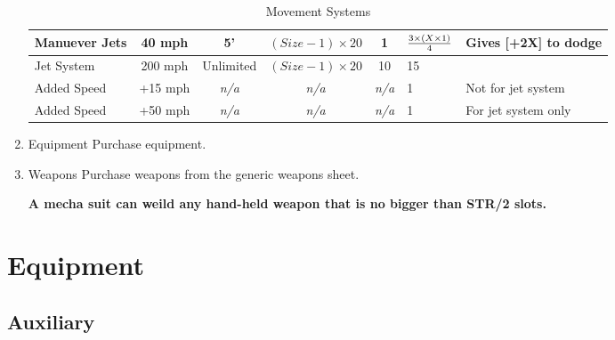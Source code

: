 \documentclass[twoside]{book}
\begin{document}
\begin{enumerate}
\begin{table}[!htb]
\begin{center}
\begin{tabular}{|l|c|c|c|c|p{2em}|p{5em}|}
\hline
Manuever Jets&40 mph&5'&\begin{math}(Size-1)\times 20\end{math}&1&\begin{math}{{3\times (X\times 1)}\over{4}}\end{math}&Gives [+2X] to dodge\\
\hline
Jet System&200 mph&Unlimited&\begin{math}(Size-1)\times 20\end{math}&10&15\\
\hline
Added Speed&+15 mph&\textit{n/a}&\textit{n/a}&\textit{n/a}&1&Not for jet system\\
\hline
Added Speed&+50 mph&\textit{n/a}&\textit{n/a}&\textit{n/a}&1&For jet system only\\
\hline

  \end{tabular}
  
\caption{Movement Systems}
  
  \end{center}
\end{table}
  
  \item Equipment
    {  
    Purchase equipment.
    }
  
  \item Weapons
    {  
    Purchase weapons from the generic weapons sheet.
    }
  

 \textbf{A mecha suit can weild any hand-held weapon that is no bigger than STR/2 slots.}


\end{enumerate}
  
    

\section{Equipment}
    
    

\subsection{Auxiliary}
    
\end{document}
